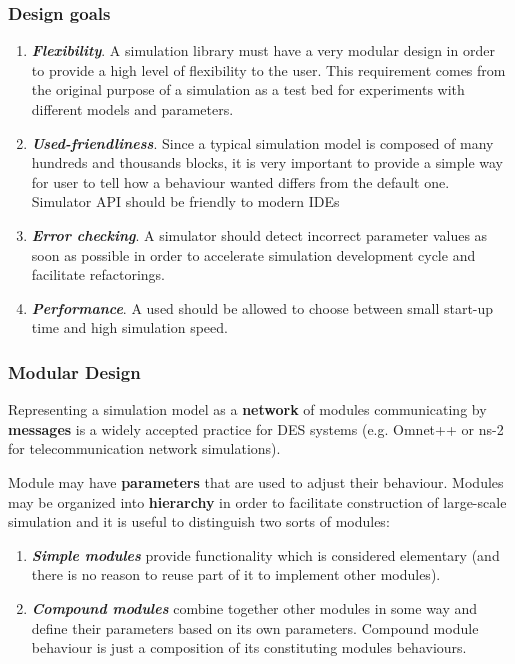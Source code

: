 \documentclass{beamer}
\begin{document}
\begin{frame}
\frametitle{Design goals}
\begin{enumerate}
  \item \textbf{\textit{Flexibility}}. A simulation library must have a very modular design in order to provide a high level of flexibility to the user. This requirement comes from the original purpose of a simulation as a test bed for experiments with different models and parameters.
  \item \textbf{\textit{Used-friendliness}}. Since a typical simulation model is composed of many hundreds and thousands blocks, it is very important to provide a simple way for user to tell how a behaviour wanted differs from the default one. Simulator API should be friendly to modern IDEs
  \item \textbf{\textit{Error checking}}. A simulator should detect incorrect parameter values as soon as possible in order to accelerate simulation development cycle and facilitate refactorings.
  \item \textbf{\textit{Performance}}. A used should be allowed to choose between small start-up time and high simulation speed.
\end{enumerate}
\end{frame}
\begin{frame}
\frametitle{Modular Design}
Representing a simulation model as a \textbf{network} of modules communicating by \textbf{messages} is a widely accepted practice for DES systems (e.g. Omnet++ or ns-2 for telecommunication network simulations).

Module may have \textbf{parameters} that are used to adjust their behaviour. Modules may be organized into \textbf{hierarchy} in order to facilitate construction of large-scale simulation and it is useful to distinguish two sorts of modules:
\begin{enumerate}
\item \textbf{\textit{Simple modules}} provide functionality which is considered elementary (and there is no reason to reuse part of it to implement other modules).

\item \textbf{\textit{Compound modules}} combine together other modules in some way and define their parameters based on its own parameters. Compound module behaviour is just a composition of its constituting modules behaviours.
\end{enumerate}
\end{frame}
\end{document}
